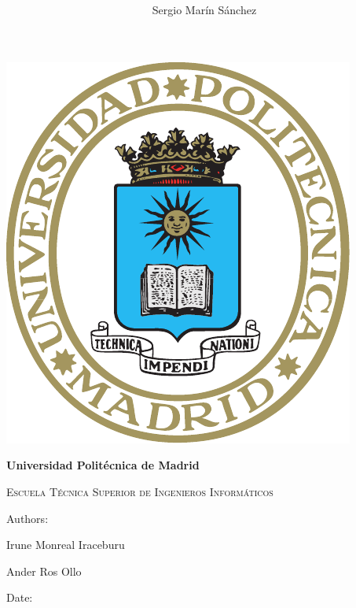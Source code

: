 \documentclass[12pt]{article}
\title{  %
}
\author{ Sergio Marín Sánchez %
}
\begin{document}
\begin{titlepage}
    \centering
    \phantom{a}
    \vspace{2cm}
    {\includegraphics[scale=0.9]{ESCUDO_UPM.pdf}\par}
    \vspace{2cm}
    {\bfseries\LARGE Universidad Politécnica de Madrid \par}
    \vspace{0.75cm}
    {\scshape\Large Escuela Técnica Superior de Ingenieros Informáticos \par}
    \vspace{0.75cm}
    {\scshape\Huge \thetitle \par}
    \vfill
    {\large Authors: \par}
    {\large \theauthor \par } 
    {\large Irune Monreal Iraceburu  \par }
    {\large Ander Ros Ollo \par }
    \vspace{0.2cm}
    {\large Date:  \par}
\end{titlepage}

\pagestyle{empty}
\tableofcontents
\clearpage
\setcounter{page}{1}


\nocite{*}

\clearpage
\pagestyle{empty}

\printbibliography
\end{document}
